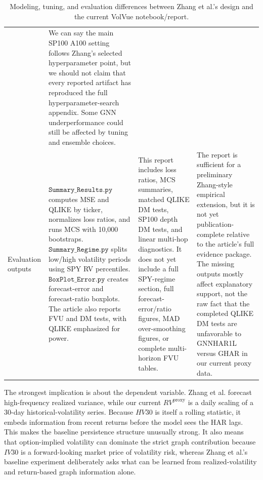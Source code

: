\documentclass[11pt]{article}
\begin{document}
\begin{table}[H]
\begin{tabular}{
>{\raggedright\arraybackslash}p{}
>{\raggedright\arraybackslash}p{}
>{\raggedright\arraybackslash}p{}
>{\raggedright\arraybackslash}p{}}
& We can say the main SP100 A100 setting follows Zhang's selected hyperparameter point, but we should not claim that every reported artifact has reproduced the full hyperparameter-search appendix.  Some GNN underperformance could still be affected by tuning and ensemble choices. \\
\addlinespace
Evaluation outputs
& \(\texttt{Summary\_Results.py}\) computes MSE and QLIKE by ticker, normalizes loss ratios, and runs MCS with 10,000 bootstraps.  \(\texttt{Summary\_Regime.py}\) splits low/high volatility periods using SPY RV percentiles.  \(\texttt{BoxPlot\_Error.py}\) creates forecast-error and forecast-ratio boxplots.  The article also reports FVU and DM tests, with QLIKE emphasized for power.
& This report includes loss ratios, MCS summaries, matched QLIKE DM tests, SP100 depth DM tests, and linear multi-hop diagnostics.  It does not yet include a full SPY-regime section, full forecast-error/ratio figures, MAD over-smoothing figures, or complete multi-horizon FVU tables.
& The report is sufficient for a preliminary Zhang-style empirical extension, but it is not yet publication-complete relative to the article's full evidence package.  The missing outputs mostly affect explanatory support, not the raw fact that the completed QLIKE DM tests are unfavorable to GNNHAR1L versus GHAR in our current proxy data. \\
\bottomrule
\end{tabular}
\caption{Modeling, tuning, and evaluation differences between Zhang et al.'s design and the current VolVue notebook/report.}
\label{tab:zhang-model-differences}
\end{table}

The strongest implication is about the dependent variable.
Zhang et al. forecast high-frequency realized variance, while our current \(RV^{\mathrm{proxy}}\) is a daily scaling of a 30-day historical-volatility series.
Because \(HV30\) is itself a rolling statistic, it embeds information from recent returns before the model sees the HAR lags.
This makes the baseline persistence structure unusually strong.
It also means that option-implied volatility can dominate the strict graph contribution because \(IV30\) is a forward-looking market price of volatility risk, whereas Zhang et al.'s baseline experiment deliberately asks what can be learned from realized-volatility and return-based graph information alone.
\end{document}
